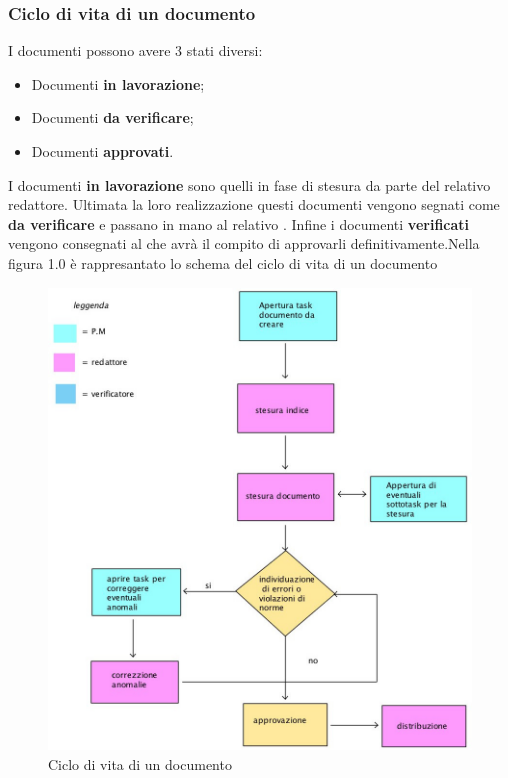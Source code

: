 \subsubsection{Ciclo di vita di un documento}
 I documenti possono avere 3 stati diversi:
\begin{itemize}
  \item Documenti \textbf{in lavorazione};
  \item Documenti \textbf{da verificare};
  \item Documenti \textbf{approvati}.
\end{itemize}
I documenti \textbf{in lavorazione} sono quelli in fase di stesura da parte del relativo redattore. Ultimata la loro realizzazione questi documenti vengono segnati come \textbf{da verificare} e passano in mano al relativo \Ver. Infine i documenti \textbf{verificati} vengono consegnati al \Pm che avrà il compito di approvarli definitivamente.Nella figura 1.0 è rappresantato lo schema del ciclo di vita di un documento
\label{figura 1.0}
\begin{figure}[ht]
	\centering
	\includegraphics[scale=0.8]{ciclo_di_vita.jpg}
	\caption{Ciclo di vita di un documento}
\end{figure}

